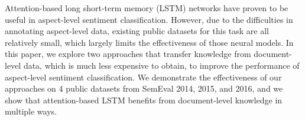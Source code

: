 Attention-based long short-term memory (LSTM) networks have proven to be useful in aspect-level sentiment classification. However, due to the difficulties in annotating aspect-level data, existing public datasets for this task are all relatively small, which largely limits the effectiveness of those neural models. In this paper, we explore two approaches that transfer knowledge from document-level data, which is much less expensive to obtain, to improve the performance of aspect-level sentiment classification. We demonstrate the effectiveness of our approaches on 4 public datasets from SemEval 2014, 2015, and 2016, and we show that attention-based LSTM benefits from document-level knowledge in multiple ways.
